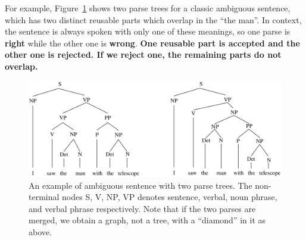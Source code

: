 \documentclass[10pt,oneside]{book}
\newcommand{\Fig}[1]{Figure~\ref{fig:#1}}
\begin{document}
For example, \Fig{ii.1.6} shows two parse trees for a classic ambiguous
sentence, which has two distinct reusable parts which overlap in the
``the man''. In context, the sentence is always spoken with only one of these
meanings, so one parse is \textbf{right} while the other one is \textbf{wrong}.
\textbf{One reusable part is accepted and the other one is rejected. If we
reject one, the remaining parts do not overlap.}
%
\begin{figure}[!htpb]
  \centering
  \includegraphics[width=0.8\linewidth]{./fig/fig_ii_1_6.png}
  \caption{An example of ambiguous sentence with two parse trees. The
    non-terminal nodes S, V, NP, VP denotes sentence, verbal, noun phrase, and
    verbal phrase respectively. Note that if the two parses are merged, we
    obtain a graph, not a tree, with a ``diamond'' in it as above.}%
  \label{fig:ii.1.6}
\end{figure}
%
\end{document}
